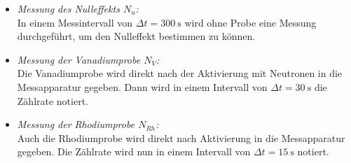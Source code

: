 \begin{itemize}
    \item \textit{Messung des Nulleffekts $N_u$:}\\
    In einem Messintervall von $\Delta t=\SI{300}{\second}$ wird ohne Probe eine Messung durchgeführt, 
    um den Nulleffekt bestimmen zu können.
    \item \textit{Messung der Vanadiumprobe $N_{V}$:}\\
    Die Vanadiumprobe wird direkt nach der Aktivierung mit Neutronen in die Messapparatur gegeben. Dann 
    wird in einem Intervall von $\Delta t=\SI{30}{\second}$ die Zählrate notiert. 
    \item \textit{Messung der Rhodiumprobe $N_{Rh}$:}\\
    Auch die Rhodiumprobe wird direkt nach Aktivierung in die Messapparatur gegeben. Die Zählrate wird 
    nun in einem Intervall von $\Delta t=\SI{15}{\second}$ notiert.
\end{itemize}